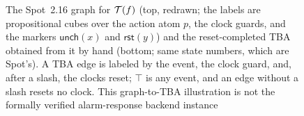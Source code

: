 \begin{figure}[!t]
\centering

\caption{The Spot~2.16 graph for $\mathcal{T}(f)$ (top, redrawn; the labels are
propositional cubes over the action atom $p$, the clock guards, and the markers
$\mathsf{unch}(x)$ and $\mathsf{rst}(y)$) and the reset-completed TBA obtained
from it by hand (bottom; same state numbers, which are Spot's). A TBA edge is labeled
by the event, the clock guard, and, after a slash, the clocks reset; $\top$ is
any event, and an edge without a slash resets no clock. This graph-to-TBA
illustration is not the formally verified alarm-response backend instance}
\label{fig:translation-steps45}
\end{figure}
